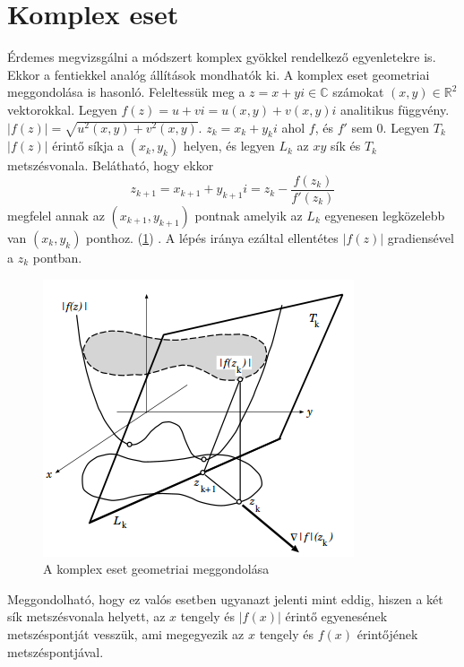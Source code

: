 \documentclass[a4paper,12pt]{report}
\begin{document}


		\section{Komplex eset}
             Érdemes megvizsgálni a módszert komplex gyökkel rendelkező egyenletekre is. Ekkor a fentiekkel analóg állítások mondhatók ki. A komplex eset geometriai meggondolása is hasonló. Feleltessük meg a $z=x+yi \in \mathbb{C}$ számokat $(x,y)\in\mathbb{R}^2$ vektorokkal. Legyen $f(z)=u+vi=u(x,y)+v(x,y)i$ analitikus függvény. $|f(z)|=\sqrt{u^2(x,y)+v^2(x,y)}$. $z_k=x_k+y_ki$ ahol $f$, és $f'$ sem 0. Legyen $T_k$ $|f(z)|$ érintő síkja a $(x_k,y_k)$ helyen, és legyen $L_k$ az $xy$ sík és $T_k$ metszésvonala. Belátható, hogy ekkor \[z_{k+1}=x_{k+1}+y_{k+1}i=z_k-\frac{f(z_k)}{f'(z_k)}\] megfelel annak az $(x_{k+1},y_{k+1})$ pontnak amelyik az $L_k$ egyenesen legközelebb van $(x_k,y_k)$ ponthoz. (\ref{k6}) \cite[p. 809]{Yau98}. A lépés iránya ezáltal ellentétes $|f(z)|$ gradiensével a $z_k$ pontban.
            \begin{figure}[htp]
				\begin{center}
				\includegraphics[scale=0.7]{kep6.png}
				\caption{A komplex eset geometriai meggondolása \cite[p. 807]{Yau98}} \label{k6}
				\end{center}
			\end{figure}
			Meggondolható, hogy ez valós esetben ugyanazt jelenti mint eddig, hiszen a két sík metszésvonala helyett, az $x$ tengely és $|f(x)|$ érintő egyenesének metszéspontját vesszük, ami megegyezik az $x$ tengely és $f(x)$ érintőjének metszéspontjával.	 	
\end{document}
